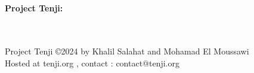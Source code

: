     \begin{titlepage}
        \begin{center}
            \vspace*{5cm}
            \Huge
            \HRule \\[0.4cm]
            \textbf{Project Tenji: \\ \TITLE}\\
            \Large 
            \HRule \\[1.5cm]
            \vspace{2cm}
            \vfill
        \end{center}
        \vfill
        { \scriptsize Project Tenji \copyright 2024 by Khalil Salahat and Mohamad El Moussawi  \\}
        { \scriptsize Hosted at tenji.org , contact : contact@tenji.org \\}
    \end{titlepage} 
    \tableofcontents
{}